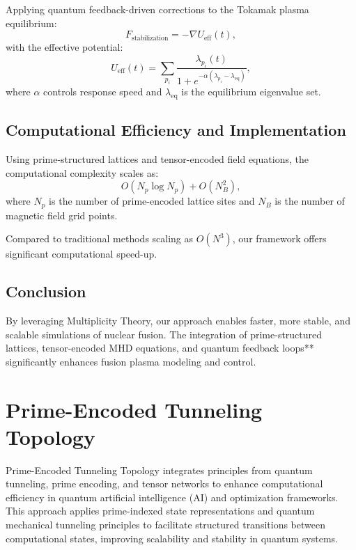\documentclass{article}
\theoremstyle{plain}
\begin{document}
Applying quantum feedback-driven corrections to the Tokamak plasma equilibrium:
\begin{equation}
    F_{\text{stabilization}} = -\nabla U_{\text{eff}}(t),
\end{equation}
with the effective potential:
\begin{equation}
    U_{\text{eff}}(t) = \sum_{p_i} \frac{\lambda_{p_i}(t)}{1 + e^{-\alpha (\lambda_{p_i} - \lambda_{\text{eq}})}},
\end{equation}
where $\alpha$ controls response speed and $\lambda_{\text{eq}}$ is the equilibrium eigenvalue set.

\subsection{Computational Efficiency and Implementation}

Using prime-structured lattices and tensor-encoded field equations, the computational complexity scales as:
\begin{equation}
    O(N_p \log N_p) + O(N_B^2),
\end{equation}
where $N_p$ is the number of prime-encoded lattice sites and $N_B$ is the number of magnetic field grid points.

Compared to traditional methods scaling as $O(N^3)$, our framework offers significant computational speed-up.

\subsection{Conclusion}
By leveraging Multiplicity Theory, our approach enables faster, more stable, and scalable simulations of nuclear fusion. The integration of prime-structured lattices, tensor-encoded MHD equations, and quantum feedback loops** significantly enhances fusion plasma modeling and control.


\section{Prime-Encoded Tunneling Topology}

Prime-Encoded Tunneling Topology integrates principles from quantum tunneling, prime encoding, and tensor networks to enhance computational efficiency in quantum artificial intelligence (AI) and optimization frameworks. This approach applies prime-indexed state representations and quantum mechanical tunneling principles to facilitate structured transitions between computational states, improving scalability and stability in quantum systems.
\end{document}
